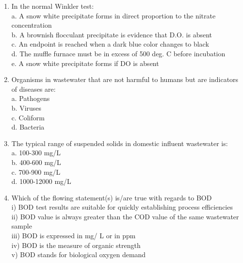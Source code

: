 \begin{tcolorbox}[breakable, enhanced,
colframe=blue!25,
colback=blue!10,
coltitle=blue!20!black,  
title= Chapter Assessment]
\begin{enumerate}
a. In a strong acid solution \\
b. In a strong caustic solution \\
c. In a safe place in a drawer \\
d. In distilled water \\
e. In a detergent 

\item In the normal Winkler test: \\

a. A snow white precipitate forms in direct proportion to the nitrate concentration \\
b. A brownish flocculant precipitate is evidence that D.O. is absent \\
c. An endpoint is reached when a dark blue color changes to black \\
d. The muffle furnace must be in excess of 500 deg. C before incubation \\
e. A snow white precipitate forms if DO is absent 

\item Organisms in wastewater that are not harmful to humans but are indicators of diseases are: \\

a. Pathogens \\
b. Viruses \\
c. Coliform \\
d. Bacteria 

\item The typical range of suspended solids in domestic influent wastewater is: \\

a. 100-300 mg/L \\
b. 400-600 mg/L \\
c. 700-900 mg/L \\
d. 1000-12000 mg/L 

\item Which of the flowing statement(s) is/are true with regards to BOD\\
i) BOD test results are suitable for quickly establishing process efficiencies\\
ii) BOD value is always greater than the COD value of the same wastewater sample\\
iii) BOD is expressed in mg/ L or in ppm\\
iv) BOD is the measure of organic strength\\
v) BOD stands for biological oxygen demand \\


\end{enumerate}
\end{tcolorbox}
